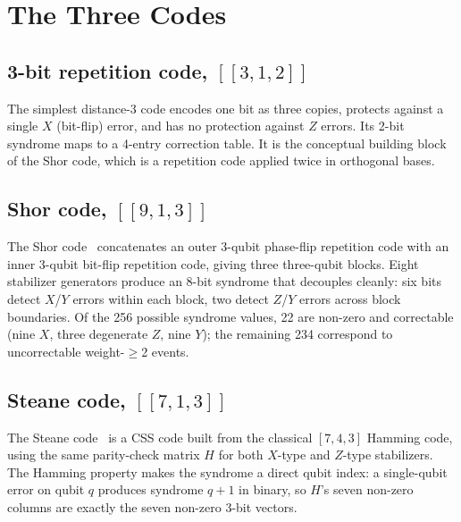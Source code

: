 \section{The Three Codes}\label{sec:codes}

\subsection{3-bit repetition code, \([[3,1,2]]\)}\label{subsec:rep3}

The simplest distance-3 code encodes one bit as three copies, protects against a single \(X\) (bit-flip) error, and has no protection against \(Z\) errors. Its 2-bit syndrome maps to a 4-entry correction table. It is the conceptual building block of the Shor code, which is a repetition code applied twice in orthogonal bases.

\subsection{Shor code, \([[9,1,3]]\)}\label{subsec:shor}

The Shor code~\cite{shor1995scheme} concatenates an outer 3-qubit phase-flip repetition code with an inner 3-qubit bit-flip repetition code, giving three three-qubit blocks. Eight stabilizer generators produce an 8-bit syndrome that decouples cleanly: six bits detect \(X\)/\(Y\) errors within each block, two detect \(Z\)/\(Y\) errors across block boundaries. Of the 256 possible syndrome values, 22 are non-zero and correctable (nine \(X\), three degenerate \(Z\), nine \(Y\)); the remaining 234 correspond to uncorrectable weight-\(\ge\)2 events.

\subsection{Steane code, \([[7,1,3]]\)}\label{subsec:steane}

The Steane code~\cite{steane1996error} is a CSS code built from the classical \([7,4,3]\) Hamming code, using the same parity-check matrix \(H\) for both \(X\)-type and \(Z\)-type stabilizers. The Hamming property makes the syndrome a direct qubit index: a single-qubit error on qubit \(q\) produces syndrome \(q+1\) in binary, so \(H\)'s seven non-zero columns are exactly the seven non-zero 3-bit vectors.

